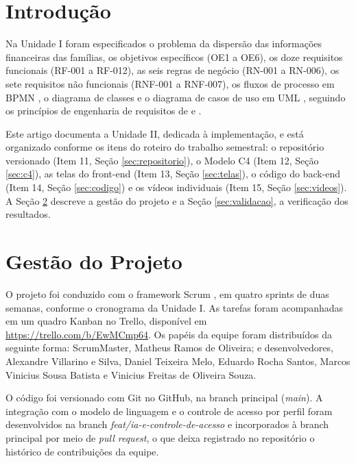 \documentclass[12pt,oneside,a4paper,article]{abntex2}
\begin{document}
\textual

\section{Introdução}

Na Unidade I foram especificados o problema da dispersão das informações financeiras das famílias, os objetivos específicos (OE1 a OE6), os doze requisitos funcionais (RF-001 a RF-012), as seis regras de negócio (RN-001 a RN-006), os sete requisitos não funcionais (RNF-001 a RNF-007), os fluxos de processo em BPMN \cite{omg2014}, o diagrama de classes e o diagrama de casos de uso em UML \cite{omg2017}, seguindo os princípios de engenharia de requisitos de  e .

Este artigo documenta a Unidade II, dedicada à implementação, e está organizado conforme os itens do roteiro do trabalho semestral: o repositório versionado (Item 11, Seção \ref{sec:repositorio}), o Modelo C4 (Item 12, Seção \ref{sec:c4}), as telas do front-end (Item 13, Seção \ref{sec:telas}), o código do back-end (Item 14, Seção \ref{sec:codigo}) e os vídeos individuais (Item 15, Seção \ref{sec:videos}). A Seção \ref{sec:gestao} descreve a gestão do projeto e a Seção \ref{sec:validacao}, a verificação dos resultados.

\section{Gestão do Projeto}
\label{sec:gestao}

O projeto foi conduzido com o framework Scrum \cite{schwaber2020}, em quatro sprints de duas semanas, conforme o cronograma da Unidade I. As tarefas foram acompanhadas em um quadro Kanban no Trello, disponível em \url{https://trello.com/b/EwMCmp64}. Os papéis da equipe foram distribuídos da seguinte forma: ScrumMaster, Matheus Ramos de Oliveira; e desenvolvedores, Alexandre Villarino e Silva, Daniel Teixeira Melo, Eduardo Rocha Santos, Marcos Vinicius Sousa Batista e Vinicius Freitas de Oliveira Souza.

O código foi versionado com Git no GitHub, na branch principal (\textit{main}). A integração com o modelo de linguagem e o controle de acesso por perfil foram desenvolvidos na branch \textit{feat/ia-e-controle-de-acesso} e incorporados à branch principal por meio de \textit{pull request}, o que deixa registrado no repositório o histórico de contribuições da equipe.
\end{document}
